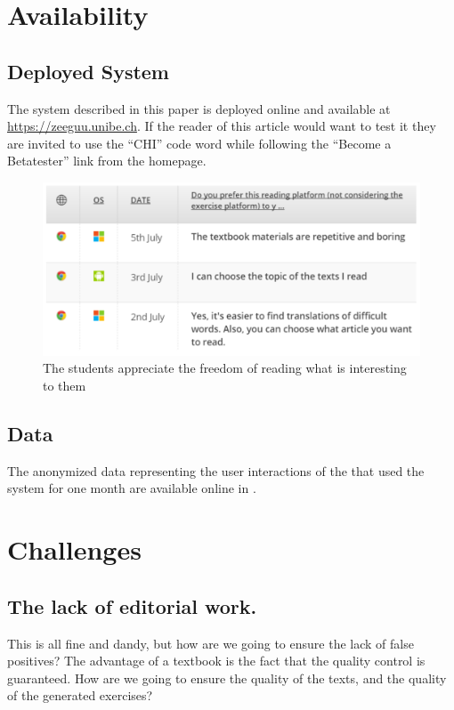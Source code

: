 


\section{Availability}

\subsection{Deployed System}
The system described in this paper is deployed online and available at \url{https://zeeguu.unibe.ch}. If the reader of this article would want to test it they are invited to use the ``CHI'' code word while following the  ``Become a Betatester'' link from the homepage.

\begin{figure}[h!]
\centering
  \includegraphics[width=0.9\columnwidth]{figures/opinion_on_reading_platform}
  \caption{The students appreciate the freedom of reading what is interesting to them }
\end{figure}

\subsection{Data}
The anonymized data representing the user interactions of the \students that used the system for one month are available online in . 




\newpage
\section{Challenges}

\subsection{The lack of editorial work.}
This is all fine and dandy, but how are we going to ensure the lack of false positives? The advantage of a textbook is the fact that the quality control is guaranteed. How are we going to ensure the quality of the texts, and the quality of the generated exercises? 

